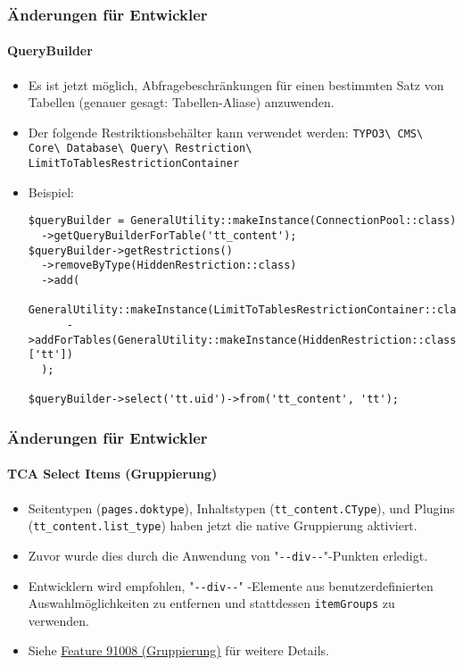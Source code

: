 \begin{frame}[fragile]
	\frametitle{Änderungen für Entwickler}
	\framesubtitle{QueryBuilder}

	\lstset{basicstyle=\tiny\ttfamily}

	\begin{itemize}
		\item Es ist jetzt möglich, Abfragebeschränkungen
			für einen bestimmten Satz von Tabellen (genauer gesagt: Tabellen-Aliase) anzuwenden.
		\item Der folgende Restriktionsbehälter kann verwendet werden:\newline
			\begingroup
				\fontsize{7}{9}
					\texttt{TYPO3\textbackslash
						CMS\textbackslash
						Core\textbackslash
						Database\textbackslash
						Query\textbackslash
						Restriction\textbackslash
						LimitToTablesRestrictionContainer}
			\endgroup

		\item Beispiel:
\begin{lstlisting}
$queryBuilder = GeneralUtility::makeInstance(ConnectionPool::class)
  ->getQueryBuilderForTable('tt_content');
$queryBuilder->getRestrictions()
  ->removeByType(HiddenRestriction::class)
  ->add(
    GeneralUtility::makeInstance(LimitToTablesRestrictionContainer::class)
      ->addForTables(GeneralUtility::makeInstance(HiddenRestriction::class), ['tt'])
  );

$queryBuilder->select('tt.uid')->from('tt_content', 'tt');
\end{lstlisting}

	\end{itemize}

\end{frame}


\begin{frame}[fragile]
	\frametitle{Änderungen für Entwickler}
	\framesubtitle{TCA Select Items (Gruppierung)}

	\begin{itemize}
		\item Seitentypen (\texttt{pages.doktype}), Inhaltstypen (\texttt{tt\_content.CType}),
			und Plugins (\texttt{tt\_content.list\_type}) haben jetzt die native Gruppierung aktiviert.
		\item Zuvor wurde dies durch die Anwendung von
			"\texttt{-}\texttt{-div-}\texttt{-}"-Punkten erledigt.
		\item Entwicklern wird empfohlen, "\texttt{-}\texttt{-div-}\texttt{-}"
			-Elemente aus benutzerdefinierten Auswahlmöglichkeiten
			zu entfernen und stattdessen \texttt{itemGroups} zu verwenden.
		\item Siehe
			\href{https://docs.typo3.org/c/typo3/cms-core/master/en-us/Changelog/10.4/Feature-91008-ItemGroupingForTCASelectItems.html}{Feature 91008 (Gruppierung)}
			für weitere Details.
	\end{itemize}

\end{frame}

